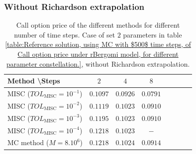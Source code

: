 \subsubsection*{Without Richardson extrapolation}
\begin{table}[!h]
	\centering
	\begin{tabular}{l*{6}{c}r}
		Method \textbackslash  Steps            & $2$ & $4$ & $8$  \\
		\hline
		MISC ($TOL_{\text{MISC}}=10^{-1}$)  &$0.1097$ & $0.0926$ & $0.0791$   \\
		MISC ($TOL_{\text{MISC}}=10^{-2}$)  & $0.1119$&  $0.1023$ & $0.0910$  \\
		MISC ($TOL_{\text{MISC}}=10^{-3}$)        & $0.1195$ &$0.1023$ &   $0.0910$  \\
		MISC ($TOL_{\text{MISC}}=10^{-4}$)        & $0.1218$ &$0.1023$ &  $-$  \\
		\hline
		MC method ($M=8.10^{6}$)   & $0.1218 $  & $0.1024 $  & $0.0914$  \\		
		\hline
	\end{tabular}
	\caption{ Call option price of the different methods for different number of time steps. Case of set $2$ parameters in table \ref{table:Reference solution, using MC with $500$ time steps, of Call option price under rBergomi model, for different parameter constellation.}, without Richardson extrapolation.}
	\label{table: Call option price of the different methods for different number of time steps. Case set 2_linear}
\end{table}



